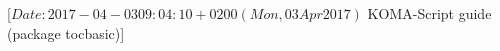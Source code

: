 %
%
%
%
%
%
%
%
% 
%
%
%
%

                 [$Date: 2017-04-03 09:04:10 +0200 (Mon, 03 Apr 2017) $
                  KOMA-Script guide (package tocbasic)]



